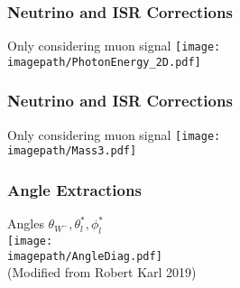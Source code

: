 
\begin{frame}\frametitle{Neutrino and ISR Corrections }

    Only considering muon signal
    \centering
    \texttt{[image: \\imagepath/PhotonEnergy\_2D.pdf]}

\end{frame}


\begin{frame}\frametitle{Neutrino and ISR Corrections }

    Only considering muon signal
    \centering
    \texttt{[image: \\imagepath/Mass3.pdf]}

\end{frame}


\begin{frame}\frametitle{Angle Extractions }

    \begin{minipage}{0.49\textwidth}
        Angles ${\theta}_{W^{-}}, {\theta}_{l}^{*}, {\phi}_{l}^{*}$\\
        \centering
        \texttt{[image: \\imagepath/AngleDiag.pdf]}
        \\
        \footnotesize(Modified from Robert Karl 2019)
    \end{minipage}
    \begin{minipage}{0.49\textwidth}
        \resizebox{\linewidth}{!}{%
        \centering
        
        }
        \bigskip
        \centering
        
    \end{minipage}

\end{frame}


